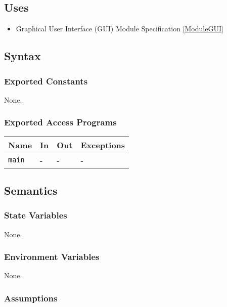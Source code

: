 \documentclass[12pt, titlepage]{article}
\def\code#1{\texttt{#1}}
\begin{document}
\subsection{Uses}

\begin{itemize}
  \item Graphical User Interface (GUI) Module Specification \ref{ModuleGUI}
\end{itemize}

\subsection{Syntax}

\subsubsection{Exported Constants}

None.

\subsubsection{Exported Access Programs}

\begin{center}
\begin{tabular}{p{2cm} p{4cm} p{4cm} p{2cm}}
\hline
\textbf{Name} & \textbf{In} & \textbf{Out} & \textbf{Exceptions} \\
\hline
\code{main} & - & - & - \\
\hline
\end{tabular}
\end{center}

\subsection{Semantics}

\subsubsection{State Variables}

None.

\subsubsection{Environment Variables}

None.

\subsubsection{Assumptions}
\end{document}
